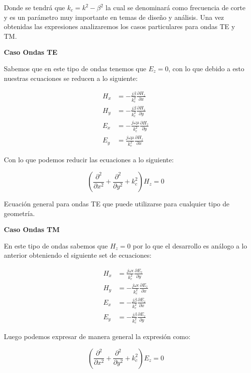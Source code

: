 \documentclass[
  11pt,
  letterpaper,
   addpoints,
   answers
  ]{exam}
\begin{document}
\begin{questions}
\begin{solution}
Donde se tendrá que $k_c = k^2 - \beta^2$ la cual se denominará como frecuencia de corte y es un parámetro muy importante en temas de diseño y análisis. Una vez obtenidas las expresiones analizaremos los casos particulares para ondas TE y TM.

\textbf{Caso Ondas TE}

Sabemos que en este tipo de ondas tenemos que $E_z = 0$, con lo que debido a esto nuestras ecuaciones se reducen a lo siguiente:

\begin{align}
    H_x &= -\frac{j\beta}{k_c^2} \frac{\partial H_z}{\partial x} \tag{16}\\
    H_y &= -\frac{j\beta}{k_c^2} \frac{\partial H_z}{\partial y} \tag{17}\\
    E_x &= -\frac{j\omega\mu}{k_c^2} \frac{\partial H_z}{\partial y} \tag{18}\\
    E_y &= \frac{j\omega\mu}{k_c^2} \frac{\partial H_z}{\partial x} \tag{19}
\end{align}

Con lo que podemos reducir las ecuaciones a lo siguiente:

\begin{equation}
    \left( \frac{\partial^2}{\partial x^2} + \frac{\partial^2}{\partial y^2} + k_c^2 \right) H_z = 0 \tag{20}
\end{equation}

Ecuación general para ondas TE que puede utilizarse para cualquier tipo de geometría.

\textbf{Caso Ondas TM}

En este tipo de ondas sabemos que $H_z = 0$ por lo que el desarrollo es análogo a lo anterior obteniendo el siguiente set de ecuaciones:

\begin{align}
    H_x &= \frac{j\omega\epsilon}{k_c^2} \frac{\partial E_z}{\partial y} \tag{21}\\
    H_y &= -\frac{j\omega\epsilon}{k_c^2} \frac{\partial E_z}{\partial x} \tag{22}\\
    E_x &= -\frac{j\beta}{k_c^2} \frac{\partial E_z}{\partial x} \tag{23}\\
    E_y &= -\frac{j\beta}{k_c^2} \frac{\partial E_z}{\partial y} \tag{24}
\end{align}

Luego podemos expresar de manera general la expresión como:

\begin{equation}
    \left( \frac{\partial^2}{\partial x^2} + \frac{\partial^2}{\partial y^2} + k_c^2 \right) E_z = 0 \tag{25}
\end{equation}


\end{solution}
\end{questions}
\end{document}
